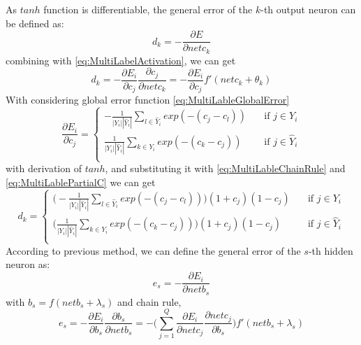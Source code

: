 As $tanh$ function is differentiable, the general error of the $k$-th output neuron can be defined as:
\begin{equation}\label{eq:MultiLableErrorDif}
d_{k} = -\frac{\partial E}{\partial netc_{k}}
\end{equation}
combining with \ref{eq:MultiLabelActivation}, we can get
\begin{equation}\label{eq:MultiLableChainRule}
d_{k} = -\frac{\partial E_{i}}{\partial c_{j}} \frac{\partial c_{j}}{\partial netc_{k}} = - \frac{\partial E_{i}}{\partial c_{j}} f'(netc_{k} + \theta_{k})
\end{equation}
With considering global error function \ref{eq:MultiLableGlobalError}
\begin{equation}\label{eq:MultiLablePartialC}
\frac{\partial E_{i}}{\partial c_{j}}= 
\begin{cases}
    -\frac{1}{|Y_{i}||\hat{Y}_{i}|} \sum_{l \in \hat{Y}_{i}} exp(-(c_{j} - c_{l}))       & \quad \text{if } j \in Y_{i}\\
    \frac{1}{|Y_{i}||\hat{Y}_{i}|} \sum_{k \in Y_{i}} exp(-(c_{k} - c_{j}))       & \quad \text{if } j \in \hat{Y}_{i}\\
  \end{cases}
\end{equation}
with derivation of $tanh$, and substituting it with \ref{eq:MultiLableChainRule} and \ref{eq:MultiLablePartialC} we can get
\begin{equation}\label{eq:MultiLableGenErr}
d_{k}= 
\begin{cases}
    \big(-\frac{1}{|Y_{i}||\hat{Y}_{i}|} \sum_{l \in \hat{Y}_{i}} exp(-(c_{j} - c_{l}))\big)(1+c_{j})(1-c_{j})       & \quad \text{if } j \in Y_{i}\\
    \big(\frac{1}{|Y_{i}||\hat{Y}_{i}|} \sum_{k \in Y_{i}} exp(-(c_{k} - c_{j}))\big)(1+c_{j})(1-c_{j})       & \quad \text{if } j \in \hat{Y}_{i}\\
  \end{cases}
\end{equation}
According to previous method, we can define the general error of the $s$-th hidden neuron as:
\begin{equation}\label{eq:MultiLableGenErrS}
e_{s} = - \frac{\partial E_{i}}{\partial netb_{s}}
\end{equation}
with $b_{s} = f(netb_{s} + \lambda_{s})$ and chain rule,
\begin{equation}\label{eq:MultiLablePartialE}
e_{s} = - \frac{\partial E_{i}}{\partial b_{s}} \frac{\partial b_{s}}{\partial netb_{s}} = - \big( \sum_{j=1}^Q \frac{\partial E_{i}}{\partial netc_{j}} \frac{\partial netc_{j}}{\partial b_{s}}\big)f'(netb_{s} + \lambda_{s})
\end{equation}
